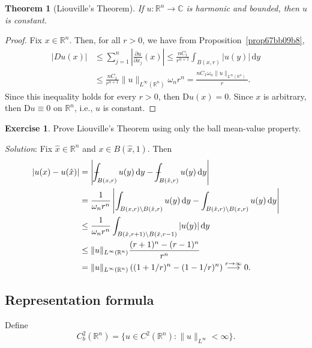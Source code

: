 \documentclass[a4paper,9pt]{amsart}
\newcommand{\R}{\mathbb{R}}	%
\newcommand{\C}{\mathbb{C}}	%
\newcommand{\did}{\,\mathrm{d}}	%
\newcommand{\de}{\partial}		%
\newcommand{\Diff}{\mathrm{D}}
\def\Xint#1{\mathchoice
      {\XXint\displaystyle\textstyle{#1}}%
      {\XXint\textstyle\scriptstyle{#1}}%
      {\XXint\scriptstyle\scriptscriptstyle{#1}}%
      {\XXint\scriptscriptstyle\scriptscriptstyle{#1}}%
      \!\int}
\def\XXint#1#2#3{{\setbox0=\hbox{$#1{#2#3}{\int}$}
        \vcenter{\hbox{$#2#3$}}\kern-.5\wd0}}
\def\fint{\Xint-}
\theoremstyle{plain}
\newtheorem{theorem}[proposition]{Theorem}
\theoremstyle{definition}
\newtheorem{exercise}[proposition]{Exercise}%
\theoremstyle{remark}
\begin{document}
\begin{theorem}[Liouville's Theorem]\label{thm67bb782e}
	If $u:\R^n\to\C$ is harmonic and bounded, then $u$ is constant.
\end{theorem}
\begin{proof}
	Fix $ x\in\R^n$.
	Then, for all $r>0$, we have from Proposition~\ref{prop67bb09b8}, 
	\begin{align*}
		|Du( x)| 
		&\le \sum_{j=1}^n \left| \frac{\de u}{\de x_j}( x) \right| 
		\le \frac{nC_1}{r^{n+1}} \int_{B( x,r)} |u(y)| \did y \\
		&\le \frac{nC_1}{r^{n+1}} \|u\|_{L^\infty(\R^n)} \omega_n r^n 
		= \frac{nC_1\omega_n \|u\|_{L^\infty(\R^n)} }{r} .
	\end{align*}
	Since this inequality holds for every $r>0$, then $\Diff u( x)=0$.
	Since $ x$ is arbitrary, then $\Diff u\equiv0$ on $\R^n$,
	i.e., $u$ is constant.
\end{proof}

\begin{exercise}
	Prove Liouville's Theorem using only the ball mean-value property.
	
	{\it Solution}:
	Fix $\hat x\in\R^n$ and $x\in B(\hat x,1)$.
	Then 
	\begin{align*}
		|u(x)-u(\hat x)|
		&= \left| \fint_{B(x,r)} u(y) \did y - \fint_{B(\hat x,r)} u(y) \did y \right| \\
		&= \frac1{\omega_nr^n} \left| \int_{B(x,r)\setminus B(\hat x,r)} u(y) \did y - \int_{B(\hat x,r)\setminus B(x,r)} u(y) \did y \right| \\
		&\le \frac1{\omega_nr^n} \int_{B(\hat x,r+1)\setminus B(\hat x,r-1)} |u(y)| \did y \\
		&\le \|u\|_{L^\infty(\R^n)} \frac{ (r+1)^n - (r-1)^n }{ r^n } \\
		&= \|u\|_{L^\infty(\R^n)} \left( (1+1/r)^n - (1-1/r)^n \right) 
		\overset{r\to\infty}\longrightarrow 0 .
	\end{align*}
\end{exercise}

\subsection{Representation formula}\label{subs67bb761c}

Define
\[
C^2_b(\R^n) = \{u\in C^2(\R^n): \|u\|_{L^\infty}<\infty \} .
\]
\end{document}

